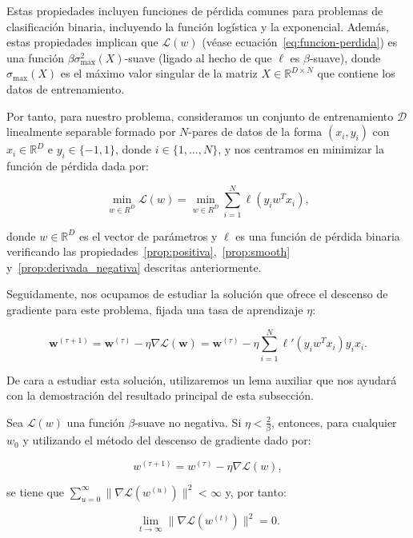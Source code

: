 Estas propiedades incluyen funciones de pérdida comunes para problemas de clasificación binaria, incluyendo la función logística y la exponencial. Además, estas propiedades implican que $\mathcal{L}(w)$ (véase ecuación~\eqref{eq:funcion-perdida}) es una función $\beta \sigma^{2}_{\max}(X)$-suave (ligado al hecho de que $\ell$ es $\beta$-suave), donde $\sigma_{\max}(X)$ es el máximo valor singular de la matriz $X \in \mathbb{R}^{D \times N}$ que contiene los datos de entrenamiento.

Por tanto, para nuestro problema, consideramos un conjunto de entrenamiento $\mathcal{D}$ linealmente separable formado por $N$-pares de datos de la forma $(x_i, y_i)$ con $x_i \in \mathbb{R}^{D}$ e $y_i \in \{ -1, 1\}$, donde $i \in \{1, \ldots, N \}$, y nos centramos en minimizar la función de pérdida dada por:

\begin{equation}\label{eq:funcion-perdida}
    \min_{w \in R^{D}}\mathcal{L}(w) = \min_{w \in R^{D}} \sum_{i=1}^{N} \ell(y_i w^{T}x_i),
\end{equation}

donde $w \in \mathbb{R}^{D}$ es el vector de parámetros y $\ell$ es una función de pérdida binaria verificando las propiedades~\ref{prop:positiva},~\ref{prop:smooth} y~\ref{prop:derivada_negativa} descritas anteriormente.

Seguidamente, nos ocupamos de estudiar la solución que ofrece el descenso de gradiente para este problema, fijada una tasa de aprendizaje $\eta$:

\[
    \mathbf{w}^{(\tau + 1)} = \mathbf{w}^{(\tau)} - \eta \nabla \mathcal{L}(\mathbf{w}) = \mathbf{w}^{(\tau)} - \eta \sum_{i=1}^{N} \ell'(y_i w^{T}x_i)y_i x_i.
\]

De cara a estudiar esta solución, utilizaremos un lema auxiliar que nos ayudará con la demostración del resultado principal de esta subsección.
\begin{lema}\label{lema:raro-clasificación-gd}
    Sea $\mathcal{L}(w)$ una función $\beta$-suave no negativa. Si $\eta < \frac{2}{\beta}$, entonces, para cualquier $w_0$ y utilizando el método del descenso de gradiente dado por:

    \[
        w^{(\tau + 1)} = w^{(\tau)} - \eta \nabla \mathcal{L}(w),
    \]

    se tiene que $\sum_{u=0}^{\infty} \| \nabla\mathcal{L}(w^{(u)}) \|^{2} < \infty$ y, por tanto:

    \[
        \lim \limits_{t \to \infty} \| \nabla\mathcal{L}(w^{(t)}) \|^{2} = 0.
    \]
\end{lema}

